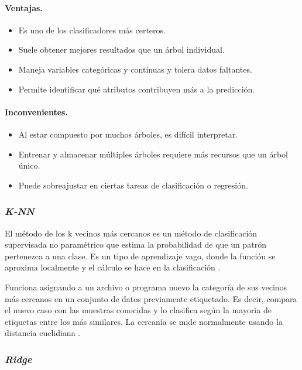 \paragraph*{\textbf{Ventajas.}}
\begin{itemize}
	\item Es uno de los clasificadores más certeros.
	\item Suele obtener mejores resultados que un árbol individual.
	\item Maneja variables categóricas y continuas y tolera datos faltantes.
	\item Permite identificar qué atributos contribuyen más a la predicción.
\end{itemize}
\cite{rf_wiki1}

\paragraph*{\textbf{Inconvenientes.}}
\begin{itemize}
	\item Al estar compuesto por muchos árboles, es difícil interpretar.
	\item Entrenar y almacenar múltiples árboles requiere más recursos que un árbol único.
	\item Puede sobreajustar en ciertas tareas de clasificación o regresión.
\end{itemize}
\cite{rf_wiki2}

\subsubsection{\textit{K-NN}}
\label{subsubsec:kneighbors}

El método de los k vecinos más cercanos es un método de clasificación supervisada no paramétrico que estima la probabilidad de que un patrón pertenezca a una clase. Es un tipo de aprendizaje vago, donde la función se aproxima localmente y el cálculo se hace en la clasificación \cite{knn_wiki}.

\vspace{1em}

Funciona asignando a un archivo o programa nuevo la categoría de sus vecinos más cercanos en un conjunto de datos previamente etiquetado. Es decir, compara el nuevo caso con las muestras conocidas y lo clasifica según la mayoría de etiquetas entre los más similares. La cercanía se mide normalmente usando la distancia euclidiana \cite{knn_sklearn}.

\subsubsection{\textit{Ridge}}
\label{subsubsec:ridge}

